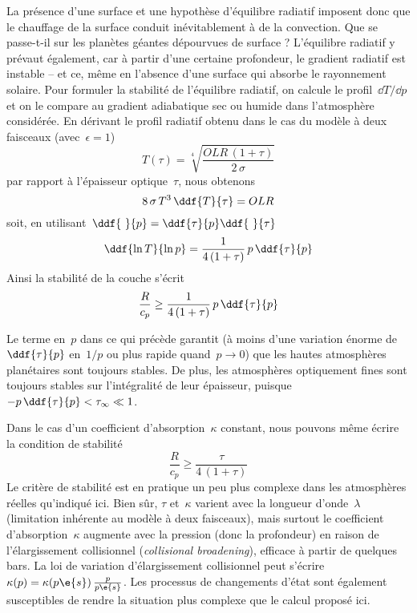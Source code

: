 \sk
La présence d'une surface et une hypothèse d'équilibre radiatif imposent donc que le chauffage de la surface conduit inévitablement à de la convection. Que se passe-t-il sur les planètes géantes dépourvues de surface ? L'équilibre radiatif y prévaut également, car à partir d'une certaine profondeur, le gradient radiatif est instable -- et ce, même en l'absence d'une surface qui absorbe le rayonnement solaire. Pour formuler la stabilité de l'équilibre radiatif, on calcule le profil~$\dd T / \dd p$ et on le compare au gradient adiabatique sec ou humide dans l'atmosphère considérée. En dérivant le profil radiatif obtenu dans le cas du modèle à deux faisceaux (avec~$\epsilon=1$)
\[ T(\tau) = \sqrt[4]{\frac{OLR\,(1+\tau)}{2\,\sigma}} \]
\noindent par rapport à l'épaisseur optique~$\tau$, nous obtenons
\[ 8 \, \sigma \, T^3 \, \ddf{T}{\tau} = OLR \]
\noindent soit, en utilisant~$\ddf{~}{p} = \ddf{\tau}{p} \ddf{~}{\tau}$
\[ \ddf{\ln T}{\ln p} = \frac{1}{4\,(1+\tau)} \, p \, \ddf{\tau}{p} \]
Ainsi la stabilité de la couche s'écrit
\[ \frac{R}{c_p} \ge \frac{1}{4\,(1+\tau)} \, p \, \ddf{\tau}{p} \]

\sk
Le terme en~$p$ dans ce qui précède garantit (à moins d'une variation énorme de $\ddf{\tau}{p}$ en~$1/p$ ou plus rapide quand~$p \rightarrow 0$) que les hautes atmosphères planétaires sont toujours stables. De plus, les atmosphères optiquement fines sont toujours stables sur l'intégralité de leur épaisseur, puisque~$-p \, \ddf{\tau}{p} < \tau_\infty \ll 1$. 

\sk
Dans le cas d'un coefficient d'absorption~$\kappa$ constant, nous pouvons même écrire la condition de stabilité
\[ \frac{R}{c_p} \ge \frac{\tau}{4\,(1+\tau)} \]
\noindent Le critère de stabilité est en pratique un peu plus complexe dans les atmosphères réelles qu'indiqué ici. Bien sûr, $\tau$ et~$\kappa$ varient avec la longueur d'onde~$\lambda$ (limitation inhérente au modèle à deux faisceaux), mais surtout le coefficient d'absorption~$\kappa$ augmente avec la pression (donc la profondeur) en raison de l'élargissement collisionnel (\emph{collisional broadening}), efficace à partir de quelques bars. La loi de variation d'élargissement collisionnel peut s'écrire~$\kappa(p) = \kappa(p\e{s}) \, \frac{p}{p\e{s}}$. Les processus de changements d'état sont également susceptibles de rendre la situation plus complexe que le calcul proposé ici.
